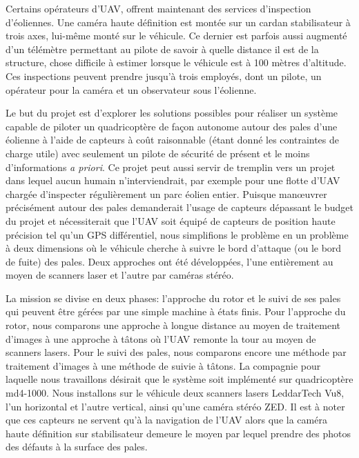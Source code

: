 Certains opérateurs d'UAV, offrent maintenant des services d'inspection d'éoliennes. Une caméra haute définition est montée sur un cardan stabilisateur à trois axes, lui-même monté sur le véhicule. Ce dernier est parfois aussi augmenté d'un télémètre permettant au pilote de savoir à quelle distance il est de la structure, chose difficile à estimer lorsque le véhicule est à 100 mètres d'altitude. Ces inspections peuvent prendre jusqu'à trois employés, dont un pilote, un opérateur pour la caméra et un observateur sous l'éolienne.

Le but du projet est d'explorer les solutions possibles pour réaliser un système capable de piloter un quadricoptère de façon autonome autour des pales d'une éolienne à l'aide de capteurs à coût raisonnable (étant donné les contraintes de charge utile) avec seulement un pilote de sécurité de présent et le moins d'informations \emph{a priori}. Ce projet peut aussi servir de tremplin vers un projet dans lequel aucun humain n'interviendrait, par exemple pour une flotte d'UAV chargée d'inspecter régulièrement un parc éolien entier. Puisque man\oe uvrer précisément autour des pales demanderait l'usage de capteurs dépassant le budget du projet et nécessiterait que l'UAV soit équipé de capteurs de position haute précision tel qu'un GPS différentiel, nous simplifions le problème en un problème à deux dimensions où le véhicule cherche à suivre le bord d'attaque (ou le bord de fuite) des pales. Deux approches ont été développées, l'une entièrement au moyen de scanners laser et l'autre par caméras stéréo.

La mission se divise en deux phases: l'approche du rotor et le suivi de ses pales qui peuvent être gérées par une simple machine à états finis. Pour l'approche du rotor, nous comparons une approche à longue distance au moyen de traitement d'images à une approche à tâtons où l'UAV remonte la tour au moyen de scanners lasers. Pour le suivi des pales, nous comparons encore une méthode par traitement d'images à une méthode de suivie à tâtons. La compagnie pour laquelle nous travaillons désirait que le système soit implémenté sur
quadricoptère md4-1000. Nous installons sur le véhicule deux scanners lasers LeddarTech Vu8, l'un horizontal et l'autre vertical, ainsi qu'une caméra stéréo ZED. Il est à noter que ces capteurs ne servent qu'à la navigation de l'UAV alors que la caméra haute définition sur stabilisateur demeure le moyen par lequel prendre des photos des défauts à la surface des pales.

